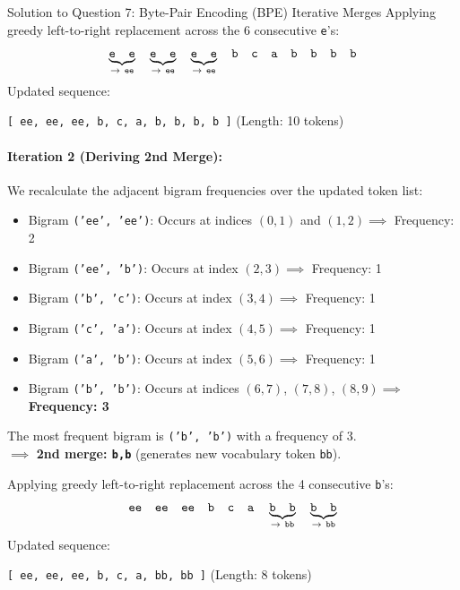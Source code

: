 \documentclass[11pt,a4paper]{article}
\begin{document}
\begin{solutionbox}{Solution to Question 7: Byte-Pair Encoding (BPE) Iterative Merges}
Applying greedy left-to-right replacement across the 6 consecutive \texttt{e}'s:
\begin{equation*}
    \underbrace{\texttt{e\quad e}}_{\to\ \texttt{ee}} \quad \underbrace{\texttt{e\quad e}}_{\to\ \texttt{ee}} \quad \underbrace{\texttt{e\quad e}}_{\to\ \texttt{ee}} \quad \texttt{b\quad c\quad a\quad b\quad b\quad b\quad b}
\end{equation*}
Updated sequence:
\begin{center}
\texttt{[ ee, ee, ee, b, c, a, b, b, b, b ]} \quad (Length: 10 tokens)
\end{center}

\paragraph{Iteration 2 (Deriving 2nd Merge):}
We recalculate the adjacent bigram frequencies over the updated token list:
\begin{itemize}[leftmargin=2em]
    \item Bigram \texttt{('ee', 'ee')}: Occurs at indices $(0,1)$ and $(1,2) \implies$ Frequency: 2
    \item Bigram \texttt{('ee', 'b')}: Occurs at index $(2,3) \implies$ Frequency: 1
    \item Bigram \texttt{('b', 'c')}: Occurs at index $(3,4) \implies$ Frequency: 1
    \item Bigram \texttt{('c', 'a')}: Occurs at index $(4,5) \implies$ Frequency: 1
    \item Bigram \texttt{('a', 'b')}: Occurs at index $(5,6) \implies$ Frequency: 1
    \item Bigram \texttt{('b', 'b')}: Occurs at indices $(6,7)$, $(7,8)$, $(8,9) \implies$ \textbf{Frequency: 3}
\end{itemize}
The most frequent bigram is \texttt{('b', 'b')} with a frequency of 3.\\
$\implies$ \textbf{2nd merge: \texttt{b,b}} (generates new vocabulary token \texttt{bb}).

Applying greedy left-to-right replacement across the 4 consecutive \texttt{b}'s:
\begin{equation*}
    \texttt{ee\quad ee\quad ee\quad b\quad c\quad a\quad} \underbrace{\texttt{b\quad b}}_{\to\ \texttt{bb}} \quad \underbrace{\texttt{b\quad b}}_{\to\ \texttt{bb}}
\end{equation*}
Updated sequence:
\begin{center}
\texttt{[ ee, ee, ee, b, c, a, bb, bb ]} \quad (Length: 8 tokens)
\end{center}


\end{solutionbox}
\end{document}
